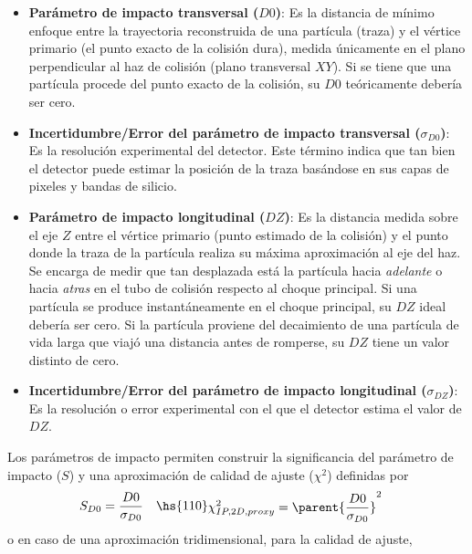         \begin{itemize}
            \item \textbf{Parámetro de impacto transversal ($D0$)}: Es la distancia de mínimo enfoque entre la trayectoria reconstruida de una partícula (traza) y el vértice primario (el punto exacto de la colisión dura), medida únicamente en el plano perpendicular al haz de colisión (plano transversal $XY$). Si se tiene que una partícula procede del punto exacto de la colisión, su $D0$ teóricamente debería ser cero.
            \item \textbf{Incertidumbre/Error del parámetro de impacto transversal ($\sigma_{D0}$)}: Es la resolución experimental del detector. Este término indica que tan bien el detector puede estimar la posición de la traza basándose en sus capas de pixeles y bandas de silicio.
            \item \textbf{Parámetro de impacto longitudinal ($DZ$)}: Es la distancia medida sobre el eje $Z$ entre el vértice primario (punto estimado de la colisión) y el punto donde la traza de la partícula realiza su máxima aproximación al eje del haz. Se encarga de medir que tan desplazada está la partícula hacia \textit{adelante} o hacia \textit{atras} en el tubo de colisión respecto al choque principal. Si una partícula se produce instantáneamente en el choque principal, su $DZ$ ideal debería ser cero. Si la partícula proviene del decaimiento de una partícula de vida larga que viajó una distancia antes de romperse, su $DZ$ tiene un valor distinto de cero.
            \item \textbf{Incertidumbre/Error del parámetro de impacto longitudinal ($\sigma_{DZ}$)}: Es la resolución o error experimental con el que el detector estima el valor de $DZ$. 
        \end{itemize}
        Los parámetros de impacto permiten construir la significancia del parámetro de impacto ($S$) y una aproximación de calidad de ajuste ($\chi^{2}$) definidas por
        \begin{equation*}
            \begin{aligned}
                S_{D0} & = \frac{D0}{\sigma_{D0}}
            \end{aligned}\hs{110}
            \begin{aligned}
                \chi^{2}_{IP,2D,proxy} & =  \parent{\frac{D0}{\sigma_{D0}}}^{2}
            \end{aligned}
        \end{equation*}
        o en caso de una aproximación tridimensional, para la calidad de ajuste,
